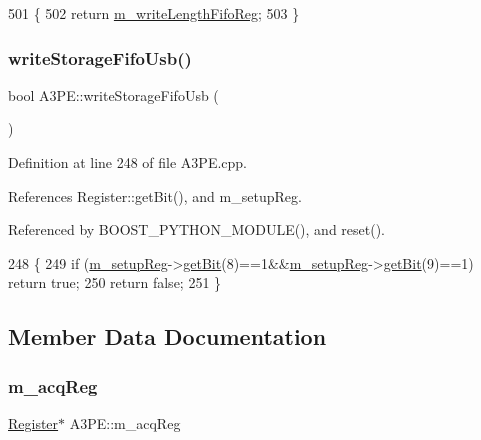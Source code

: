 \begin{DoxyCode}
501                                 \{
502     \textcolor{keywordflow}{return} \hyperlink{classA3PE_a9a0cb2253ea34c0be567a03684217fee}{m\_writeLengthFifoReg};
503   \}
\end{DoxyCode}
\mbox{\label{classA3PE_af15048318a126074e28df1c6120d5e0d}} 
\subsubsection{\texorpdfstring{write\+Storage\+Fifo\+Usb()}{writeStorageFifoUsb()}}
{\footnotesize\ttfamily bool A3\+P\+E\+::write\+Storage\+Fifo\+Usb (\begin{DoxyParamCaption}{ }\end{DoxyParamCaption})}



Definition at line 248 of file A3\+P\+E.\+cpp.



References Register\+::get\+Bit(), and m\+\_\+setup\+Reg.



Referenced by B\+O\+O\+S\+T\+\_\+\+P\+Y\+T\+H\+O\+N\+\_\+\+M\+O\+D\+U\+L\+E(), and reset().


\begin{DoxyCode}
248                               \{
249   \textcolor{keywordflow}{if} (\hyperlink{classA3PE_a142fa10b7e705c4701ae21678ec2ec8a}{m\_setupReg}->\hyperlink{classRegister_a5d27c9ff548817eee097ba4fdc8e8f69}{getBit}(8)==1&&\hyperlink{classA3PE_a142fa10b7e705c4701ae21678ec2ec8a}{m\_setupReg}->\hyperlink{classRegister_a5d27c9ff548817eee097ba4fdc8e8f69}{getBit}(9)==1) \textcolor{keywordflow}{return} \textcolor{keyword}{true};
250   \textcolor{keywordflow}{return} \textcolor{keyword}{false};
251 \}
\end{DoxyCode}


\subsection{Member Data Documentation}
\mbox{\label{classA3PE_abaf426f4c9192537117b77f9f4821e04}} 
\subsubsection{\texorpdfstring{m\+\_\+acq\+Reg}{m\_acqReg}}
{\footnotesize\ttfamily \hyperlink{classRegister}{Register}$\ast$ A3\+P\+E\+::m\+\_\+acq\+Reg\hspace{0.3cm}{\ttfamily [private]}}



